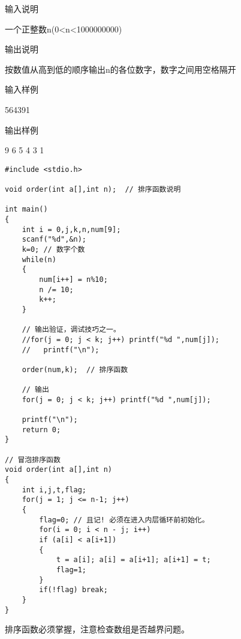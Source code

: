 输入说明	

一个正整数n(0<n<1000000000)

输出说明	

按数值从高到低的顺序输出n的各位数字，数字之间用空格隔开

输入样例	

564391

输出样例
	
9 6 5 4 3 1

\begin{lstlisting}
#include <stdio.h>

void order(int a[],int n);  // 排序函数说明

int main()
{
	int i = 0,j,k,n,num[9];
	scanf("%d",&n);
	k=0; // 数字个数 
	while(n)
	{
		num[i++] = n%10;
		n /= 10;
		k++;
    } 

	// 输出验证，调试技巧之一。 
	//for(j = 0; j < k; j++) printf("%d ",num[j]);
	//   printf("\n");

	order(num,k);  // 排序函数
	
	// 输出
	for(j = 0; j < k; j++) printf("%d ",num[j]);
	
	printf("\n");
	return 0;
} 

// 冒泡排序函数 
void order(int a[],int n)
{ 
	int i,j,t,flag; 
	for(j = 1; j <= n-1; j++)
	{ 
		flag=0; // 且记! 必须在进入内层循环前初始化。
		for(i = 0; i < n - j; i++)
		if (a[i] < a[i+1]) 
		{ 
			t = a[i]; a[i] = a[i+1]; a[i+1] = t; 
			flag=1;
		}
		if(!flag) break;
	}
}
\end{lstlisting}

\begin{note}[要点]
	排序函数必须掌握，注意检查数组是否越界问题。
\end{note}
